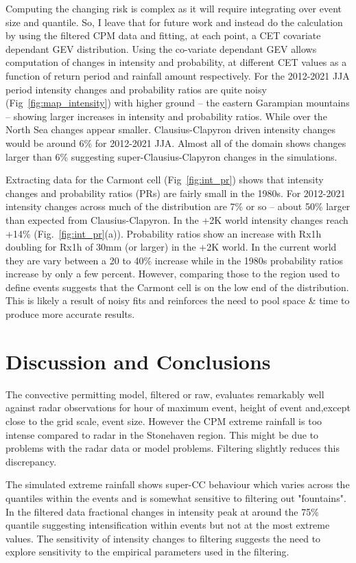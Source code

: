 \documentclass[11pt,a4paper]{article}
\begin{document}
Computing the changing risk is complex as it will require integrating over event size and quantile. So, I leave that for future work  and instead do the  calculation by using the  filtered CPM data and fitting, at each point, a CET covariate dependant GEV distribution.  Using the co-variate dependant GEV allows computation of changes in intensity and probability, at different CET values as a function of return period and  rainfall amount respectively. For the 2012-2021 JJA period intensity changes and probability ratios are quite noisy (Fig~\ref{fig:map_intensity}) with higher ground -- the eastern Garampian mountains  -- showing larger increases in intensity and probability ratios. While over the North Sea changes appear smaller. Clausius-Clapyron driven intensity changes would be around 6\% for 2012-2021 JJA. Almost all of the domain shows changes larger than 6\% suggesting super-Clausius-Clapyron changes in the simulations. 

Extracting data for the Carmont cell (Fig~\ref{fig:int_pr}) shows that intensity changes and probability ratios (PRs) are fairly small in the 1980s. For 2012-2021 intensity changes across much of the distribution are 7\% or so -- about 50\% larger than expected from Clausius-Clapyron. In the +2K world intensity changes reach +14\% (Fig.~\ref{fig:int_pr}(a)). Probability ratios show an increase with Rx1h 
doubling for Rx1h of 30mm (or larger) in the +2K world. In the current world they are vary between a  20 to 40\% increase while in the 1980s probability ratios increase by only a few percent.  However, comparing those to the region used to define events suggests that the Carmont cell is on the low end of the distribution. This is likely a result of noisy fits and reinforces the need to pool space \& time to produce more accurate results. 



\section{Discussion and Conclusions}
The convective permitting model, filtered or raw, evaluates remarkably well against radar observations for hour of maximum event, height of event and,except close to the grid scale, event size. However the CPM extreme rainfall is too intense compared to radar in the Stonehaven region. This might be due to problems with the radar data or model problems.  Filtering slightly reduces this discrepancy. 

The simulated extreme rainfall shows super-CC behaviour  which varies across the quantiles within the events and is somewhat sensitive to filtering out "fountains". In the filtered data fractional changes in intensity peak at around the 75\% quantile suggesting intensification within events but not at the most extreme values. The sensitivity of intensity changes to filtering suggests the need to explore sensitivity to the empirical parameters used in the filtering.
 
\end{document}
